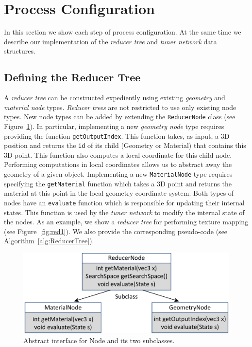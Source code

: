 \section{Process Configuration}
\label{sec:config}
In this section we show each step of process configuration. At the same time we describe our implementation of the \emph{reducer tree} and \emph{tuner network} data structures.

\subsection{Defining the Reducer Tree}
A \emph{reducer tree} can be constructed expediently using existing \emph{geometry} and \emph{material node} types. \emph{Reducer trees} are not restricted to use only existing node types. New node types can be added by extending the \verb|ReducerNode| class (see Figure~\ref{fig:node}). In particular, implementing a new \emph{geometry node} type requires providing the function \verb|getOutputIndex|. This function takes, as input, a 3D position and returns the \verb|id| of its child (Geometry or Material) that contains this 3D point. This function also computes a local coordinate for this child node. Performing computations in local coordinates allows us to abstract away the geometry of a given object. Implementing a new \verb|MaterialNode| type requires specifying the \verb|getMaterial| function which takes a 3D point and returns the material at this point in the local geometry coordinate system. Both types of nodes have an \verb|evaluate| function which is responsible for updating their internal states. This function is used by the \emph{tuner network} to modify the internal state of the nodes. As an example, we show a \emph{reducer tree} for performing texture mapping (see Figure~\ref{fig:red1}). We also provide the corresponding pseudo-code (see Algorithm~\ref{alg:ReducerTree}).



\begin{figure}[h]
\centering
\includegraphics[width=\linewidth]{figure/node.pdf}
\caption{Abstract interface for Node and its two subclasses.}
\label{fig:node}
\end{figure}


